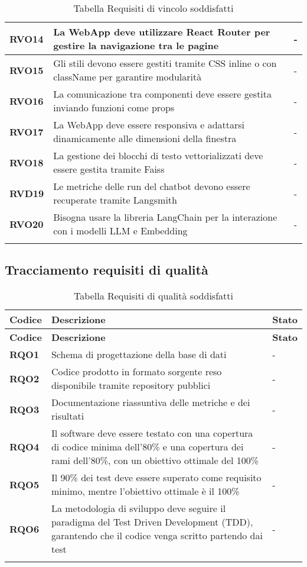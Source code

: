 \begin{longtable}{|>{\centering\arraybackslash}m{}|>{\centering\arraybackslash}m{}|>{\centering\arraybackslash}m{}|}
    \hline
    \textbf{RVO14} & La WebApp deve utilizzare React Router per gestire la navigazione tra le pagine & - \\
    \hline
    \textbf{RVO15} & Gli stili devono essere gestiti tramite CSS inline o con className per garantire modularità & - \\
    \hline
    \textbf{RVO16} & La comunicazione tra componenti deve essere gestita inviando funzioni come props & - \\
    \hline
    \textbf{RVO17} & La WebApp deve essere responsiva e adattarsi dinamicamente alle dimensioni della finestra & - \\
    \hline
    \textbf{RVO18} & La gestione dei blocchi di testo vettorializzati deve essere gestita tramite Faiss & - \\
    \hline
    \textbf{RVD19} & Le metriche delle run del chatbot devono essere recuperate tramite Langsmith & - \\
    \hline
    \textbf{RVO20} & Bisogna usare la libreria LangChain per la interazione con i modelli LLM e Embedding & - \\
    \hline
\caption{Tabella Requisiti di vincolo soddisfatti}
\end{longtable}
\newpage
\subsection{Tracciamento requisiti di qualità}

\begin{longtable}{|>{\centering\arraybackslash}m{}|>{\centering\arraybackslash}m{}|>{\centering\arraybackslash}m{}|}
	\hline
	\textbf{Codice} & \textbf{Descrizione} & \textbf{Stato}\\\hline
	\endfirsthead
	\hline
	\textbf{Codice} & \textbf{Descrizione} & \textbf{Stato}\\\hline
	\endhead
	\hline
    \textbf{RQO1} & Schema di progettazione della base di dati & - \\
    \hline
    \textbf{RQO2} & Codice prodotto in formato sorgente reso disponibile tramite repository pubblici & - \\
    \hline
    \textbf{RQO3} & Documentazione riassuntiva delle metriche e dei risultati & - \\
    \hline
    \textbf{RQO4} & Il software deve essere testato con una copertura di codice minima dell'80\% e una copertura dei rami dell'80\%, con un obiettivo ottimale del 100\% & - \\
    \hline
    \textbf{RQO5} & Il 90\% dei test deve essere superato come requisito minimo, mentre l'obiettivo ottimale è il 100\% & - \\
    \hline
    \textbf{RQO6} & La metodologia di sviluppo deve seguire il paradigma del Test Driven Development (TDD), garantendo che il codice venga scritto partendo dai test & - \\
    \hline

\caption{Tabella Requisiti di qualità soddisfatti}
\end{longtable}


